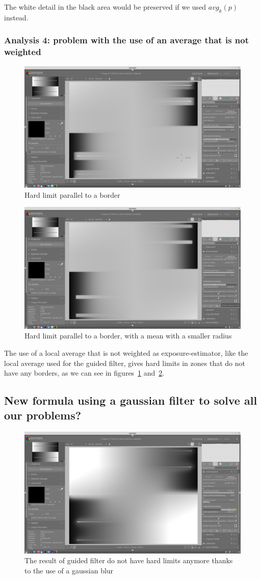 \documentclass[12pt,a4paper]{article}
\begin{document}
The white detail in the black area would be preserved if we used $avg_k(p)$ instead.

\subsubsection{Analysis 4: problem with the use of an average that is not weighted}
\begin{figure}[h]
\centering
\includegraphics[width=0.7\linewidth]{img/mean1}
\caption{Hard limit parallel to a border}
\label{fig:mean1}
\end{figure}
\begin{figure}[h]
\centering
\includegraphics[width=0.7\linewidth]{img/mean2}
\caption{Hard limit parallel to a border, with a mean with a smaller radius}
\label{fig:mean2}
\end{figure}
The use of a local average that is not weighted as exposure-estimator, like the local average used for the guided filter, gives hard limits in zones that do not have any borders, as we can see in figures~\ref{fig:mean1} and~\ref{fig:mean2}.


\subsection{New formula using a gaussian filter to solve all our problems?}
\begin{figure}[h]
\centering
\includegraphics[width=0.7\linewidth]{img/gaussian}
\caption{The result of guided filter do not have hard limits anymore thanks to the use of a gaussian blur}
\label{fig:gaussian}
\end{figure}
\end{document}
